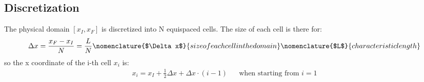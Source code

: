 \documentclass[11pt, a4paper]{article}
\begin{document}
\subsection{Discretization}
The physical domain $\left[x_I,x_F\right]$ is discretized into N equispaced cells. The size of each cell is there for:
\begin{equation}
    \Delta x=\frac{x_F-x_I}{N}=\frac{L}{N}
    \nomenclature{$\Delta x$}{size of each cell in the domain}
    \nomenclature{$L$}{characteristic length}
\end{equation}
so the x coordinate of the i-th cell $x_i$ is:
\begin{equation}
    \begin{matrix}
        \displaystyle x_i=x_I+\frac{1}{2}\Delta x+\Delta x\cdot\left(i-1\right) && \text{when starting from $i=1$}
    \end{matrix}
\end{equation}
\end{document}
